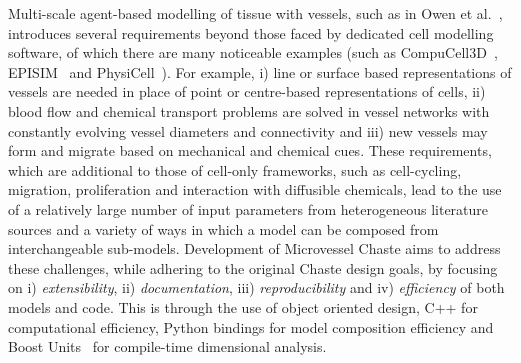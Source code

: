\documentclass[10pt,letterpaper]{article}
\begin{document}
Multi-scale agent-based modelling of tissue with vessels, such as in Owen et al.~\cite{Owen2011}, introduces several requirements beyond those faced by dedicated cell modelling software, of which there are many noticeable examples (such as CompuCell3D~\cite{Swat2012}, EPISIM~\cite{Sutterlin2013} and PhysiCell~\cite{Macklin2012}). For example, i) line or surface based representations of vessels are needed in place of point or centre-based representations of cells, ii) blood flow and chemical transport problems are solved in vessel networks with constantly evolving vessel diameters and connectivity and iii) new vessels may form and migrate based on mechanical and chemical cues. These requirements, which are additional to those of cell-only frameworks, such as cell-cycling, migration, proliferation and interaction with diffusible chemicals, lead to the use of a relatively large number of input parameters from heterogeneous literature sources and a variety of ways in which a model can be composed from interchangeable sub-models. Development of Microvessel Chaste aims to address these challenges, while adhering to the original Chaste design goals, by focusing on i) \emph{extensibility}, ii) \emph{documentation}, iii) \emph{reproducibility} and iv) \emph{efficiency} of both models and code. This is through the use of object oriented design, C++ for computational efficiency, Python bindings for model composition efficiency and Boost Units~\cite{boost161} for compile-time dimensional analysis. 
\end{document}
